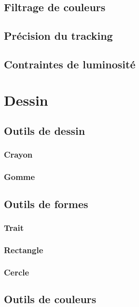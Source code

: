 \documentclass[11pt,a4paper,oldfontcommands]{memoir}
\begin{document}
\subsection{Filtrage de couleurs}

\subsection{Précision du tracking}

\subsection{Contraintes de luminosité}

\newpage

\section{Dessin}

\subsection{Outils de dessin}

\subsubsection{Crayon}

\subsubsection{Gomme}

\subsection{Outils de formes}

\subsubsection{Trait}

\subsubsection{Rectangle}

\subsubsection{Cercle}

\subsection{Outils de couleurs}
\end{document}

